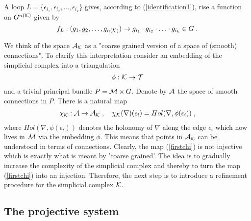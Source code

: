 \documentclass[12pt]{article}
\newcommand{\ba}{\begin{eqnarray}}
\newcommand{\ea}{\end{eqnarray}}
\def\e{\epsilon}
\def\ca{{\cal A}}
\def\ck{{\cal K}}
\def\cm{{\cal M}}
\def\ct{{\cal T}}
\begin{document}
A loop $L=\{\e_{i_1},\e_{i_2},\ldots,\e_{i_k} \}$ gives, according to (\ref{identification1}), rise a function on $G^{n(\ck)}$ given by
\[
f_L:(g_1,g_2,\ldots,g_{n(\ck)})\rightarrow g_{i_1}\cdot g_{i_2}\cdot\ldots\cdot g_{i_k}\in G\;.
\]

We think of the space $\ca_\ck$ as a "coarse grained version of a space of (smooth) connections". To clarify this interpretation consider an embedding of the simplicial complex into a triangulation
\ba 
\phi:\ck\rightarrow\ct
\label{EmBeD}
\ea 
and a trivial principal bundle $P=\cm\times G$. Denote by $\ca$ the space of smooth connections in $P$. There is a natural map 
\ba
\chi_\ck:\ca\rightarrow\ca_\ck\;,\quad\chi_\ck(\nabla)(\e_i)=Hol(\nabla,\phi(\e_i))\;,
\label{firstchi}
\ea
where $Hol(\nabla,\phi(\e_i))$ denotes the holonomy of $\nabla$ along the edge $\e_i$ which now lives in $\cm$ via the embedding $\phi$. This means that points in $\ca_\ck$ can be understood in terms of connections. Clearly, the map (\ref{firstchi}) is not injective which is exactly what is meant by 'coarse grained'. The idea is to gradually increase the complexity of the simplicial complex and thereby to turn the map (\ref{firstchi}) into an injection. Therefore, the next step is to  introduce a refinement procedure for the simplicial complex $\ck$.



















\subsection{The projective system}
\label{sec-proje}
\end{document}
